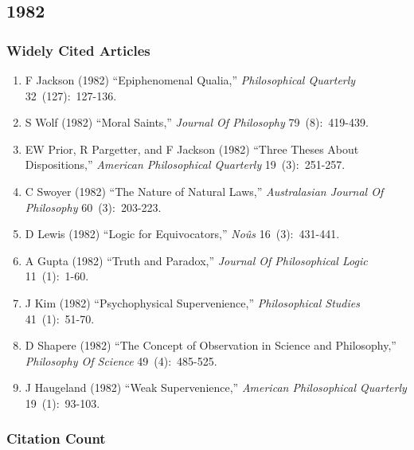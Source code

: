 \documentclass[
  10pt,
  letterpaper,
  DIV=11,
  numbers=noendperiod,
  twoside]{scrartcl}
\providecommand{\tightlist}{%
  \setlength{\itemsep}{0pt}\setlength{\parskip}{0pt}}\usepackage{longtable,booktabs,array}
\begin{document}
\newpage

\subsection{1982}\label{sec-s1982}

\subsubsection*{Widely Cited Articles}\label{widely-cited-articles-25}

\begin{enumerate}
\def\labelenumi{\arabic{enumi}.}
\tightlist
\item
  F Jackson (1982) ``Epiphenomenal Qualia,'' \emph{Philosophical
  Quarterly} 32~(127):~127-136.
\item
  S Wolf (1982) ``Moral Saints,'' \emph{Journal Of Philosophy}
  79~(8):~419-439.
\item
  EW Prior, R Pargetter, and F Jackson (1982) ``Three Theses About
  Dispositions,'' \emph{American Philosophical Quarterly}
  19~(3):~251-257.
\item
  C Swoyer (1982) ``The Nature of Natural Laws,'' \emph{Australasian
  Journal Of Philosophy} 60~(3):~203-223.
\item
  D Lewis (1982) ``Logic for Equivocators,'' \emph{Noûs}
  16~(3):~431-441.
\item
  A Gupta (1982) ``Truth and Paradox,'' \emph{Journal Of Philosophical
  Logic} 11~(1):~1-60.
\item
  J Kim (1982) ``Psychophysical Supervenience,'' \emph{Philosophical
  Studies} 41~(1):~51-70.
\item
  D Shapere (1982) ``The Concept of Observation in Science and
  Philosophy,'' \emph{Philosophy Of Science} 49~(4):~485-525.
\item
  J Haugeland (1982) ``Weak Supervenience,'' \emph{American
  Philosophical Quarterly} 19~(1):~93-103.
\end{enumerate}

\subsubsection*{Citation Count}\label{sec-count-1982}
\end{document}
